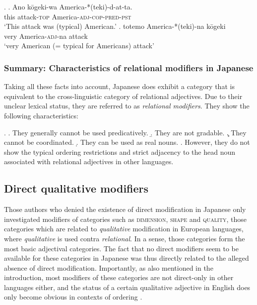 \documentclass [output=book,colorlinks,citecolor=brown]{langscibook}
\begin{document}
\ex. \label{like} \ag. Ano kōgeki-wa America-*(teki)-d-at-ta.\\
this attack-\textsc{top} America-\textsc{adj}-\textsc{cop-pred-pst}\\
`This attack was (typical) American.'
\bg. totemo America-*(teki)-na kōgeki\\
very America-\textsc{adj}-na attack\\
`very American (= typical for Americans) attack'

\subsubsection{Summary: Characteristics of relational modifiers in Japanese}

Taking all these facts into account, Japanese does exhibit a category that is equivalent to the cross-linguistic category of relational adjectives. Due to their unclear lexical status, they are referred to as \textit{relational modifiers}. They show the following characteristics:

\newpage

\ex. \a. They generally cannot be used predicatively.
\b. They are not gradable.
\c. They cannot be coordinated.
\d. They can be used as real nouns.
\e. However, they do not show the typical ordering restrictions and strict adjacency to the head noun associated with relational adjectives in other languages.

\subsection{Direct qualitative modifiers} \label{QM}

Those authors who denied the existence of direct modification in Japanese \citep{sproat:1991:the, laenzlinger:2011:elements} only investigated modifiers of categories such as \textsc{dimension}, \textsc{shape} and \textsc{quality}, those categories which are related to \textit{qualitative} modification in European languages, where \textit{qualitative} is used contra \textit{relational}. In a sense, those categories form the most basic adjectival categories. The fact that no direct modifiers seem to be available for these categories in Japanese was thus directly related to the alleged absence of direct modification. Importantly, as also mentioned in the introduction, most modifiers of these categories are not direct-only in other languages either, and the status of a certain qualitative adjective in English does only become obvious in contexts of ordering \citep{cinque:2010:adj, laenzlinger:2011:elements}. %
\end{document}
